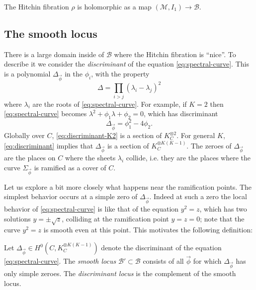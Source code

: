 \documentclass[12pt,letterpaper,reqno]{article}
\numberwithin{equation}{section}
\newcommand{\cB}{\ensuremath{\mathcal B}}
\newcommand{\cM}{\ensuremath{\mathcal M}}
\newcommand{\ti}[1]{\textit{#1}}
\newcommand{\fixme}[1]{{\color{orange}{[#1]}}}
\begin{document}
\begin{prop} The Hitchin fibration $\rho$
is holomorphic as a map $(\cM, I_1) \to \cB$.
\end{prop}

\begin{pf} \fixme{...}
\end{pf}

\subsection{The smooth locus}

There is a large domain inside of $\cB$ where the Hitchin
fibration is ``nice''. To describe it we consider the \ti{discriminant}
of the equation \eqref{eq:spectral-curve}.
This is a polynomial $\Delta_{\vec\phi}$ in the $\phi_i$,
with the property
\begin{equation} \label{eq:discriminant}
  \Delta = \prod_{i > j} (\lambda_i - \lambda_j)^2
\end{equation}
where $\lambda_i$ are the roots of \eqref{eq:spectral-curve}.
For example, if $K=2$
then \eqref{eq:spectral-curve} becomes
$\lambda^2 + \phi_1 \lambda + \phi_2 = 0$, which has discriminant
\begin{equation} \label{eq:discriminant-K2}
  \Delta_{\vec\phi} = \phi_1^2 - 4 \phi_2.
\end{equation}
Globally over $C$, \eqref{eq:discriminant-K2}
is a section of $K_C^{\otimes 2}$.
For general $K$, \eqref{eq:discriminant} implies that
$\Delta_{\vec\phi}$ is a section of $K_C^{\otimes K(K-1)}$.
The zeroes of $\Delta_{\vec\phi}$ are the places on $C$ where the
sheets $\lambda_i$ collide, i.e. they are the places where
the curve $\Sigma_{\vec\phi}$ is ramified as a cover of $C$.

Let us explore a bit more closely what happens near the ramification
points.
The simplest behavior occurs at a simple zero of $\Delta_{\vec\phi}$.
Indeed at such a zero the local behavior of \eqref{eq:spectral-curve}
is like that of the
equation $y^2 = z$, which has
two solutions $y = \pm \sqrt{z}$, colliding at the ramification point
$y=z=0$; note that the curve $y^2 = z$ is smooth even at this point.
This motivates the following definition:

\begin{defn}
Let $\Delta_{\vec\phi} \in H^0(C, K_C^{\otimes K(K-1)})$ denote the discriminant of the
equation \eqref{eq:spectral-curve}.
The \ti{smooth locus} $\cB' \subset \cB$ consists of all $\vec\phi$
for which $\Delta_{\vec\phi}$ has only simple zeroes.
The \ti{discriminant locus} is the complement of the smooth locus.
\end{defn}
\end{document}
